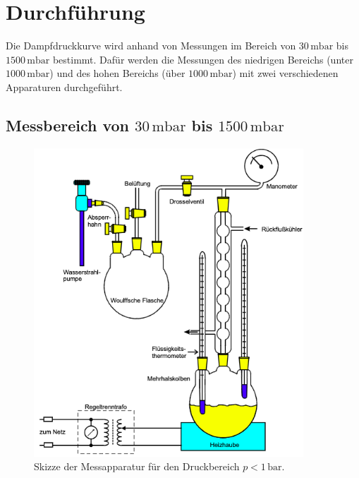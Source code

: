 \section{Durchführung}
\label{sec:Durchführung}
Die Dampfdruckkurve wird anhand von Messungen im Bereich von $30\,\unit{\milli\bar}$ bis $1500\, \unit{\milli\bar}$ bestimmt.
Dafür werden die Messungen des niedrigen Bereichs (unter $1000\, \unit{\milli\bar}$) und des hohen Bereichs (über $1000\, \unit{\milli\bar}$)
mit zwei verschiedenen Apparaturen durchgeführt.
\subsection{Messbereich von $30\,\unit{\milli\bar}$ bis $1500\, \unit{\milli\bar}$}
\label{sec:ErsteDurchführung}
\begin{figure}[H]
    \centering
    \includegraphics[width=0.90\textwidth]{Erste_Apparatur.png}
    \caption{Skizze der Messapparatur für den Druckbereich $p<1\,\unit{\bar}$. \cite{anleitungV203}}
    \label{fig:ErsteApparatur}
\end{figure}
